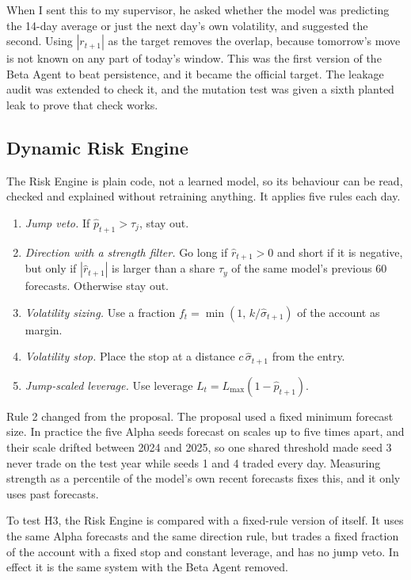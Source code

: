 When I sent this to my supervisor, he asked whether the model was predicting the 14-day average or just the next day's own volatility, and suggested the second. Using $|r_{t+1}|$ as the target removes the overlap, because tomorrow's move is not known on any part of today's window. This was the first version of the Beta Agent to beat persistence, and it became the official target. The leakage audit was extended to check it, and the mutation test was given a sixth planted leak to prove that check works.

\subsection{Dynamic Risk Engine}\label{sec:risk-engine}

The Risk Engine is plain code, not a learned model, so its behaviour can be read, checked and explained without retraining anything. It applies five rules each day.

\begin{enumerate}
  \item \emph{Jump veto.} If $\hat p_{t+1} > \tau_j$, stay out.
  \item \emph{Direction with a strength filter.} Go long if $\hat r_{t+1}>0$ and short if it is negative, but only if $|\hat r_{t+1}|$ is larger than a share $\tau_y$ of the same model's previous 60 forecasts. Otherwise stay out.
  \item \emph{Volatility sizing.} Use a fraction $f_t=\min(1,\,k/\hat\sigma_{t+1})$ of the account as margin.
  \item \emph{Volatility stop.} Place the stop at a distance $c\,\hat\sigma_{t+1}$ from the entry.
  \item \emph{Jump-scaled leverage.} Use leverage $L_t = L_{\max}(1-\hat p_{t+1})$.
\end{enumerate}

Rule 2 changed from the proposal. The proposal used a fixed minimum forecast size. In practice the five Alpha seeds forecast on scales up to five times apart, and their scale drifted between 2024 and 2025, so one shared threshold made seed 3 never trade on the test year while seeds 1 and 4 traded every day. Measuring strength as a percentile of the model's own recent forecasts fixes this, and it only uses past forecasts.

To test H3, the Risk Engine is compared with a fixed-rule version of itself. It uses the same Alpha forecasts and the same direction rule, but trades a fixed fraction of the account with a fixed stop and constant leverage, and has no jump veto. In effect it is the same system with the Beta Agent removed.

